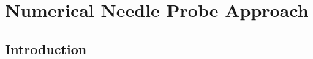 \chapter{Numerical Needle Probe Approach}
\label{sec:numerical-np}
\bigskip

\section{Introduction} 
\label{sec:numerical-np:introduction}

%
%

